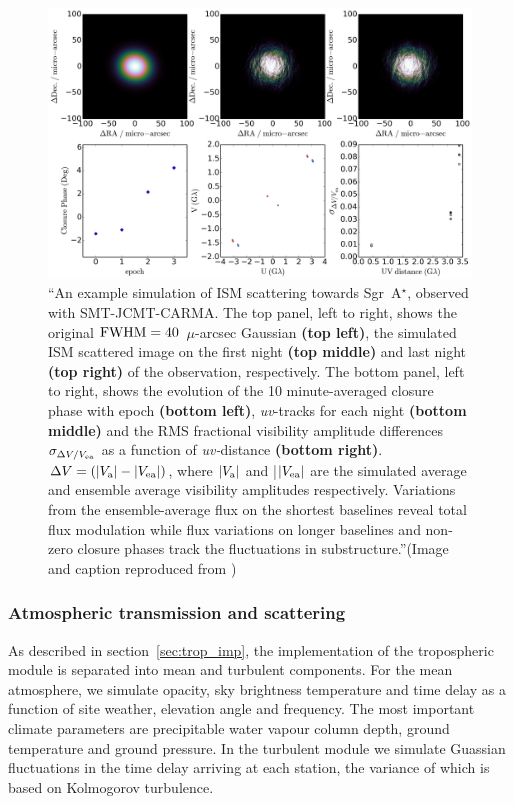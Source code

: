 \begin{figure}[h!]
\includegraphics[width=\columnwidth]{Images/ism}
\caption{``An example simulation of ISM scattering towards Sgr~A$^{\star}$, observed with SMT-JCMT-CARMA.  The top panel, left to right, shows the original $\rm FWHM = 40$~$\mu$-arcsec Gaussian {\bf (top left)}, the simulated ISM scattered image on the first night {\bf (top middle)} and last night {\bf (top right)} of the observation, respectively.  The bottom panel, left to right,  shows the evolution of the 10 minute-averaged closure phase with epoch {\bf (bottom left)}, {\sl uv}-tracks for each night {\bf (bottom middle)} and the RMS fractional visibility amplitude differences $\sigma_{\Delta V /V_{\rm ea}}$ as a function of {\sl uv-}distance {\bf (bottom right)}. $ \Delta V= (|V_{\rm a}|-|V_{\rm ea}|)$, where $|V_{\rm a}|$ and |$|V_{\rm ea}|$ are the simulated average and ensemble average visibility amplitudes respectively. Variations from the ensemble-average flux on the shortest baselines reveal total flux modulation while flux variations on longer baselines and non-zero closure phases track the fluctuations in substructure.''(Image and caption reproduced from \citet{Blecher_2016}) \label{ISM_sequence}%
}
\end{figure}

\subsubsection{Atmospheric transmission and scattering}

As described in section~\ref{sec:trop_imp}, the implementation of the tropospheric module is separated into mean and turbulent components. For the mean atmosphere, we simulate opacity, sky brightness temperature and time delay as a function of site weather, elevation angle and frequency. The most important climate parameters are precipitable water vapour column depth, ground temperature and ground pressure. In the turbulent module we simulate Guassian fluctuations in the time delay arriving at each station, the variance of which is based on Kolmogorov turbulence.

